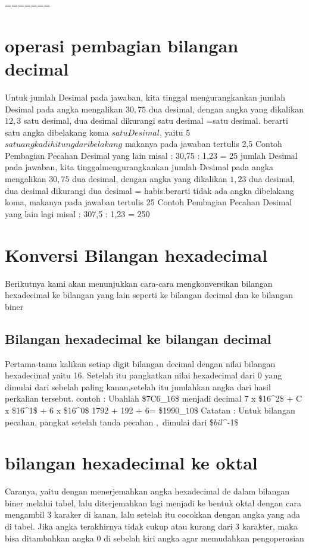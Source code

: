 =======
\section{operasi pembagian bilangan decimal}
Untuk jumlah Desimal pada jawaban, kita tinggal mengurangkankan jumlah Desimal pada angka mengalikan \(30,75\) dua desimal, 
dengan angka yang dikalikan \(12,3\) satu desimal, 
dua desimal dikurangi satu desimal =satu desimal. berarti satu angka dibelakang koma \(satu Desimal\), yaitu 5 \(satu angka dihitung dari belakang\) makanya pada jawaban tertulis 2,5
 Contoh Pembagian Pecahan Desimal yang lain misal : 
 30,75 : 1,23 = 25
jumlah Desimal pada jawaban, kita tinggalmengurangkankan jumlah Desimal pada angka mengalikan \(30,75\) dua desimal, 
dengan angka yang dikalikan \(1,23\) dua desimal, 
dua desimal dikurangi dua desimal = habis.berarti tidak ada angka dibelakang koma, makanya pada jawaban tertulis 25
 Contoh Pembagian Pecahan Desimal yang lain lagi misal : 
 307,5 : 1,23 = 250
\section{Konversi Bilangan hexadecimal}
Berikutnya kami akan menunjukkan cara-cara mengkonversikan bilangan hexadecimal ke bilangan yang lain seperti ke bilangan decimal dan ke bilangan biner
\subsection{Bilangan hexadecimal ke bilangan decimal}
Pertama-tama kalikan setiap digit bilangan decimal dengan nilai bilangan hexadecimal yaitu 16. Setelah itu pangkatkan nilai hexadecimal dari 0 yang dimulai dari sebelah paling kanan,setelah itu jumlahkan angka dari hasil perkalian tersebut.
contoh : 
Ubahlah \$7C6_\(16\)\$ menjadi decimal
		7 x \$16^2\$ + C x \$16^1\$ + 6 x \$16^0\$
		1792 + 192 + 6= \$1990_\(10\)\$
Catatan : Untuk bilangan pecahan, pangkat setelah tanda pecahan \(,\) dimulai dari \$\(bil\)^-1\$

\section{bilangan hexadecimal ke oktal}
Caranya, yaitu dengan menerjemahkan angka hexadecimal de dalam bilangan biner melalui tabel, lalu diterjemahkan lagi menjadi ke bentuk oktal dengan cara mengambil 3 karaker di kanan, lalu setelah itu cocokkan dengan angka yang ada di tabel. Jika angka terakhirnya tidak cukup atau kurang dari 3 karakter, maka bisa ditambahkan angka 0 di sebelah kiri angka agar memudahkan pengoperasian

